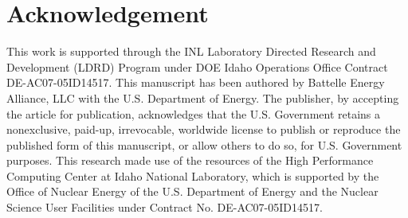 \documentclass[review]{elsarticle}
\begin{document}
\section{Acknowledgement}
This work is supported through the INL Laboratory Directed Research and Development (LDRD) Program under DOE Idaho Operations Office Contract DE-AC07-05ID14517. This manuscript has been authored by Battelle Energy Alliance, LLC with the U.S. Department of Energy. The publisher, by accepting the article for publication, acknowledges that the U.S. Government retains a nonexclusive, paid-up, irrevocable, worldwide license to publish or reproduce the published form of this manuscript, or allow others to do so, for U.S. Government purposes. This research made use of the resources of the High Performance Computing Center at Idaho National Laboratory, which is supported by the Office of Nuclear Energy of the U.S. Department of Energy and the Nuclear Science User Facilities under Contract No. DE-AC07-05ID14517. 


\end{document}
